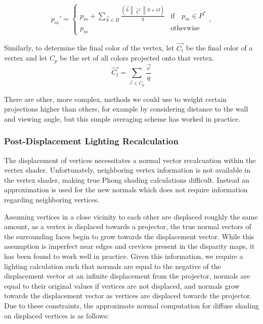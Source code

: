 \documentclass[twocolumn]{article}
\begin{document}
\begin{equation}
p_{m}' = \left \{ 
\begin{array}{ll}
p_{m} + \sum\limits_{\vec{b} \in B} \frac{(\vec{b} \begin{Vmatrix}\vec{C}\end{Vmatrix} S + O)}{q} & \text{if} \quad p_{m} \in P^{*}\\
p_{m} & \text{otherwise}
\end{array},\right.
\label{eq:displaceBlend}
\end{equation}

Similarly, to determine the final color of the vertex, let $\vec{C_t}$ be the final color of a vertex and let $C_p$ be the set of all colors projected onto that vertex. 
\begin{equation}
\vec{C_t} = \sum\limits_{\vec{c} \in C_p} \frac{\vec{c}}{q} 
\label{eq:colorBlend}
\end{equation}

There are other, more complex, methods we could use to weight certain projections higher than others, for example by considering distance to the wall and viewing angle, but this simple averaging scheme has worked in practice. 

\subsubsection{Post-Displacement Lighting Recalculation}

The displacement of vertices necessitates a normal vector recalcuation within the vertex shader. Unfortunately, neighboring vertex information is not available in the vertex shader, making true Phong shading calculations difficult. Instead an approximation is used for the new normals which does not require information regarding neighboring vertices.

Assuming vertices in a close vicinity to each other are displaced roughly the same amount, as a vertex is displaced towards a projector, the true normal vectors of the surrounding faces begin to grow towards the displacement vector. While this assumption is imperfect near edges and crevices present in the disparity maps, it has been found to work well in practice. 
Given this information, we require a lighting calculation such that normals are equal to the negative of the displacement vector at an infinite displacement from the projector, normals are equal to their original values if vertices are not displaced, and normals grow towards the displacement vector as vertices are displaced towards the projector. Due to these constraints, the approximate normal computation for diffuse shading on displaced vertices is as follows:
\end{document}
